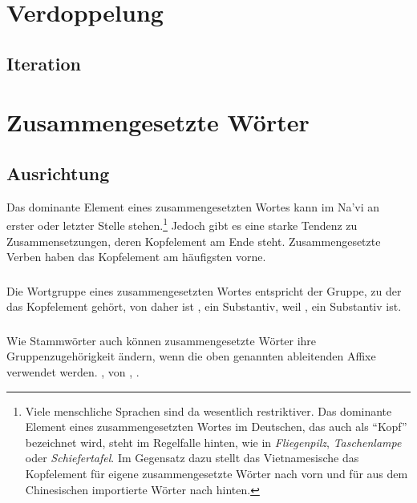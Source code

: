 \section{Verdoppelung}

\subsection{Iteration} 



\section{Zusammengesetzte W\"orter}

\subsection{Ausrichtung} Das dominante Element eines zusammengesetzten Wortes kann
im Na’vi an erster oder letzter Stelle stehen.\footnote{Viele menschliche Sprachen
sind da wesentlich restriktiver. Das dominante Element eines zusammengesetzten Wortes
im Deutschen, das auch als "`Kopf"' bezeichnet wird, steht im Regelfalle hinten, wie
in \textit{Fliegenpilz}, \textit{Taschenlampe} oder \textit{Schiefertafel}. Im
Gegensatz dazu stellt das Vietnamesische das Kopfelement f\"ur eigene zusammengesetzte
W\"orter nach vorn und f\"ur aus dem Chinesischen importierte W\"orter nach hinten.}
Jedoch gibt es eine starke Tendenz zu Zusammensetzungen, deren Kopfelement am Ende
steht. Zusammengesetzte Verben haben das Kopfelement am h\"aufigsten vorne.

\subsubsection{} Die Wortgruppe eines zusammengesetzten Wortes entspricht der
Gruppe, zu der das Kopfelement geh\"ort, von daher ist ,
 ein Substantiv, weil ,  ein Substantiv ist.

\subsubsection{} Wie Stammw\"orter auch k\"onnen zusammengesetzte W\"orter ihre
Gruppenzugeh\"origkeit \"andern, wenn die oben genannten ableitenden Affixe
verwendet werden. ,  von , .


